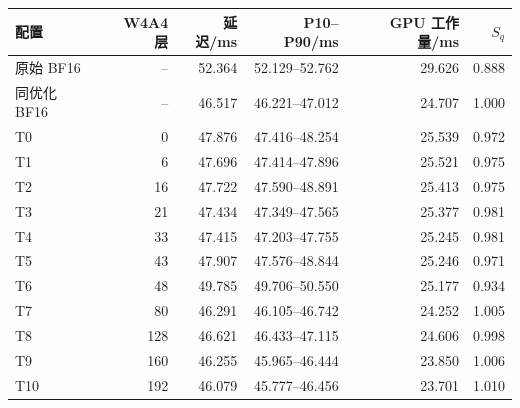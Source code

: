 \begin{tabular}{lrrrrr}
\toprule
配置 & W4A4 层 & 延迟/ms & P10--P90/ms & GPU 工作量/ms & $S_q$ \\
\midrule
原始 BF16 & -- & 52.364 & 52.129--52.762 & 29.626 & 0.888 \\
同优化 BF16 & -- & 46.517 & 46.221--47.012 & 24.707 & 1.000 \\
T0 & 0 & 47.876 & 47.416--48.254 & 25.539 & 0.972 \\
T1 & 6 & 47.696 & 47.414--47.896 & 25.521 & 0.975 \\
T2 & 16 & 47.722 & 47.590--48.891 & 25.413 & 0.975 \\
T3 & 21 & 47.434 & 47.349--47.565 & 25.377 & 0.981 \\
T4 & 33 & 47.415 & 47.203--47.755 & 25.245 & 0.981 \\
T5 & 43 & 47.907 & 47.576--48.844 & 25.246 & 0.971 \\
T6 & 48 & 49.785 & 49.706--50.550 & 25.177 & 0.934 \\
T7 & 80 & 46.291 & 46.105--46.742 & 24.252 & 1.005 \\
T8 & 128 & 46.621 & 46.433--47.115 & 24.606 & 0.998 \\
T9 & 160 & 46.255 & 45.965--46.444 & 23.850 & 1.006 \\
T10 & 192 & 46.079 & 45.777--46.456 & 23.701 & 1.010 \\
\bottomrule
\end{tabular}
